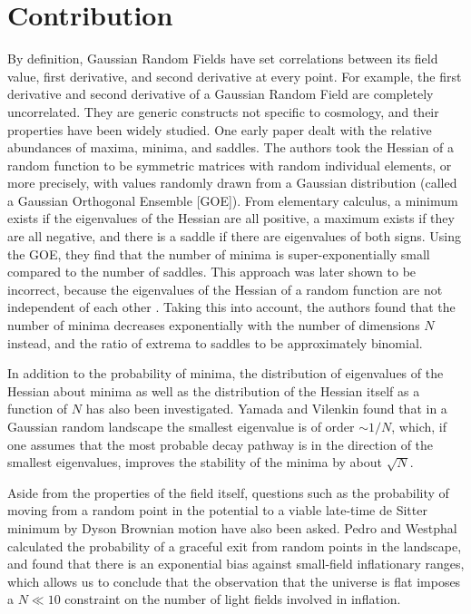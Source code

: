 \documentclass[12pt]{article}
\begin{document}
\section{Contribution}
By definition, Gaussian Random Fields have set correlations between its field value, first derivative, and second derivative at every point. For example, the first derivative and second derivative of a Gaussian Random Field are completely uncorrelated. They are generic constructs not specific to cosmology, and their properties have been widely studied. One early paper dealt with the relative abundances of maxima, minima, and saddles.\cite{Aazami2006} The authors took the Hessian of a random function to be symmetric matrices with random individual elements, or more precisely, with values randomly drawn from a Gaussian distribution (called a Gaussian Orthogonal Ensemble [GOE]). From elementary calculus, a minimum exists if the eigenvalues of the Hessian are all positive, a maximum exists if they are all negative, and there is a saddle if there are eigenvalues of both signs. Using the GOE, they find that the number of minima is super-exponentially small compared to the number of saddles. This approach was later shown to be incorrect, because the eigenvalues of the Hessian of a random function are not independent of each other \cite{Easther2016}. Taking this into account, the authors found that the number of minima decreases exponentially with the number of dimensions $N$ instead, and the ratio of extrema to saddles to be approximately binomial.

In addition to the probability of minima, the distribution of eigenvalues of the Hessian about minima as well as the distribution of the Hessian itself as a function of $N$ has also been investigated.\cite{Yamada2018}\cite{Fyodorov2018} Yamada and Vilenkin\cite{Yamada2018} found that in a Gaussian random landscape the smallest eigenvalue is of order $\sim 1/N$, which, if one assumes that the most probable decay pathway is in the direction of the smallest eigenvalues, improves the stability of the minima by about $\sqrt{N}$.

Aside from the properties of the field itself, questions such as the probability of moving from a random point in the potential to a viable late-time de Sitter minimum by Dyson Brownian motion have also been asked.\cite{Pedro2017} Pedro and Westphal calculated the probability of a graceful exit from random points in the landscape, and found that there is an exponential bias against small-field inflationary ranges, which allows us to conclude that the observation that the universe is flat imposes a $N \ll 10$ constraint on the number of light fields involved in inflation.
\end{document}
